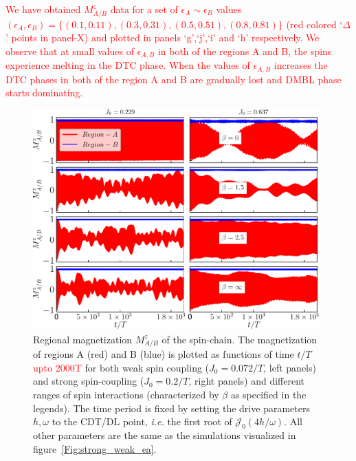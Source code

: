 \documentclass[12pt]{iopart}
\newcommand{\red}[1]{\textcolor{red}{#1}}
\begin{document}
\red{We have obtained $M^z_{A/B}$ data for a set of $\epsilon_A \sim \epsilon_B$ values $(\epsilon_{A},\epsilon_{B}) = \{(0.1,0.11), (0.3,0.31),(0.5,0.51),(0.8,0.81)\}$ (red colored `$\Delta$' points in panel-X) and plotted in panels `g',`j',`i' and `h' respectively. We observe that at small values of $\epsilon_{A,B}$ in both of the regions A and B, the spins experience melting in the DTC phase. When the values of $\epsilon_{A,B}$ increases the DTC phases in both of the region A and B are gradually lost and DMBL phase starts dominating.}
\begin{figure}[t]
	\centering
	\hspace{1.5cm}\includegraphics[width = 11cm]{figure9.pdf}
	\caption{Regional magnetization $M^z_{A/B}$ of the spin-chain. The magnetization of regions A (red) and B (blue) is plotted as functions of time $t/T$ \red{upto 2000T} for both weak spin coupling ($J_0=0.072/T$, left panels) and strong spin-coupling ($J_0=0.2/T$, right panels) and different ranges of spin interactions (characterized by $\beta$ as specified in the legends). The time period is fixed by setting the drive parameters $h,\omega$ to the CDT/DL point, \textit{i.e.} the first root of $\mathcal{J}_0(4h/\omega)$. All other parameters are the same as the simulations visualized in figure~\ref{Fig:strong_weak_ea}.}
	\label{Fig:regiogionalmag}
\end{figure}
\end{document}

